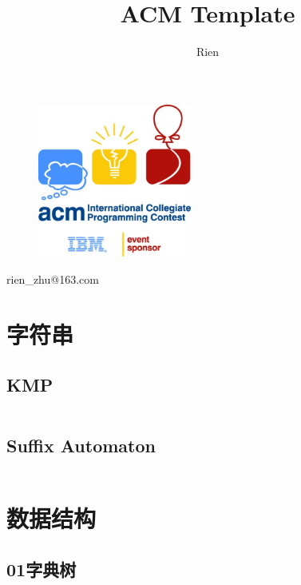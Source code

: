 \documentclass[a4paper,11pt]{article}
\author{Rien}
\title{ACM Template}
\begin{document}
\maketitle %

\begin{figure}[H]
    \centering
    \includegraphics[width=0.45\textwidth,]{picture/logo.jpg}
    \vspace{0.5cm}
\end{figure}
\centerline{rien\_zhu@163.com}
\newpage %
\tableofcontents %
\newpage
\section{字符串}
\subsection{KMP}
\inputminted[breaklines,linenos,frame=leftline]{c++}{string/kmp.cc}

\subsection{Suffix Automaton}
\inputminted[breaklines]{c++}{string/suffix-automaton.cc}
\newpage
\section{数据结构}
\subsection{01字典树}
\inputminted[breaklines]{c++}{DataStruct/trie.cpp}


\newpage
\end{document}
